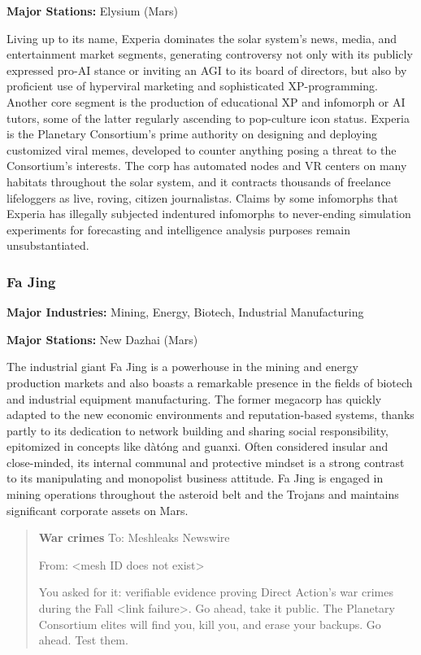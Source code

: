 \textbf{Major Stations:} Elysium (Mars) 

Living up to its name, Experia dominates the solar system's news, media, and entertainment market segments, generating controversy not only with its publicly expressed pro-AI stance or inviting an AGI to its board of directors, but also by proficient use of hyperviral marketing and sophisticated XP-programming. Another core segment is the production of educational XP and infomorph or AI tutors, some of the latter regularly ascending to pop-culture icon status. Experia is the Planetary Consortium's prime authority on designing and deploying customized viral memes, developed to counter anything posing a threat to the Consortium's interests. The corp has automated nodes and VR centers on many habitats throughout the solar system, and it contracts thousands of freelance lifeloggers as live, roving, citizen journalistas. Claims by some infomorphs that Experia has illegally subjected indentured infomorphs to never-ending simulation experiments for forecasting and intelligence analysis purposes remain unsubstantiated. 

\subsubsection{Fa Jing} \label{sec:fa-jing} 

\textbf{Major Industries:} Mining, Energy, Biotech, Industrial Manufacturing 

\textbf{Major Stations:} New Dazhai (Mars) 

The industrial giant Fa Jing is a powerhouse in the mining and energy production markets and also boasts a remarkable presence in the fields of biotech and industrial equipment manufacturing. The former megacorp has quickly adapted to the new economic environments and reputation-based systems, thanks partly to its dedication to network building and sharing social responsibility, epitomized in concepts like dàtóng and guanxi. Often considered insular and close-minded, its internal communal and protective mindset is a strong contrast to its manipulating and monopolist business attitude. Fa Jing is engaged in mining operations throughout the asteroid belt and the Trojans and maintains significant corporate assets on Mars. 

\begin{quotation} \textbf{War crimes} To: Meshleaks Newswire 

From: <mesh ID does not exist> 

You asked for it: verifiable evidence proving Direct Action's war crimes during the Fall <link failure>. Go ahead, take it public. The Planetary Consortium elites will find you, kill you, and erase your backups. Go ahead. Test them. \end{quotation} 

